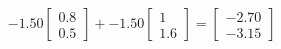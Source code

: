 \documentclass[preview]{standalone}
\begin{document}
\begin{align*}
-1.50 \begin{bmatrix} 0.8 \\ 0.5 \end{bmatrix} + -1.50 \begin{bmatrix} 1 \\ 1.6 \end{bmatrix} = \begin{bmatrix} -2.70 \\ -3.15 \end{bmatrix}
\end{align*}
\end{document}
